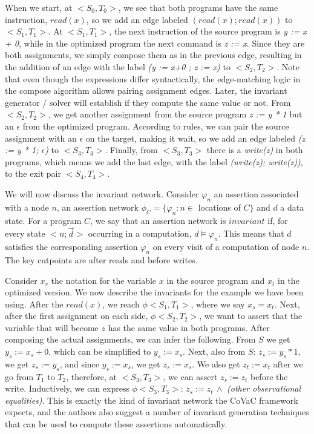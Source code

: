 When we start, at $<S_0, T_0>$, we see that both programs have the same instruction, $read(x)$, so we add an edge labeled $(read(x); read(x))$ to $<S_1, T_1>$.
At $<S_1, T_1>$, the next instruction of the source program is \emph{y := x + 0}, while in the optimized program the next command is \emph{z := x}.
Since they are both assignments, we simply compose them as in the previous edge, resulting in the addition of an edge with the label \emph{(y := x+0 ; z := x)} to $<S_2, T_2>$.
Note that even though the expressions differ syntactically, the edge-matching logic in the compose algorithm allows pairing assignment edges.
Later, the invariant generator / solver will establish if they compute the same value or not.
From $<S_2, T_2>$, we get another assignment from the source program \emph{z := y * 1} but an $\epsilon$ from the optimized program.
According to rules, we can pair the source assignment with an $\epsilon$ on the target, making it wait, so we add an edge labeled \emph{(z := y * 1; $\epsilon$)} to $<S_3, T_3>$.
Finally, from $<S_3, T_3>$ there is a \emph{write(z)} in both programs, which means we add the last edge, with the label \emph{(write(z); write(z))}, to the exit pair $<S_4, T_4>$.

We will now discuss the invariant network.
Consider $\varphi_n$ an assertion associated with a node $n$, an assertion network $\phi_C = \{ \varphi_n : n \in$ locations of $C \}$ and $d$ a data state.
For a program $C$, we say that an assertion network is $invariant$ if, for every state $<n;\overrightarrow{d}>$ occurring in a computation, $d \vDash \varphi_n$.
This means that $d$ satisfies the corresponding assertion $\varphi_n$ on every visit of a computation of node $n$. 
The key cutpoints are after reads and before writes.

Consider $x_s$ the notation for the variable $x$ in the source program and $x_t$ in the optimized version.
We now describe the invariants for the example we have been using.
After the $read(x)$, we reach $\phi<S_1, T_1>$, where we say $x_s = x_t$.
Next, after the first assignment on each side, $\phi<S_2, T_2>$, we want to assert that the variable that will become $z$ has the same value in both programs.
After composing the actual assignments, we can infer the following.
From $S$ we get $y_s := x_s + 0$, which can be simplified to $y_s := x_s$.
Next, also from $S$: $z_s := y_s * 1$, we get $z_s := y_s$, and since $y_s := x_s$, we get $z_s := x_s$.
We also get $z_t := x_t$ after we go from $T_1$ to $T_2$, therefore, at $<S_3, T_3>$, we can assert $z_s := z_t$ before the write.
Inductively, we can express $\phi<S_3, T_3> : \, z_s := z_t \, \land$ \emph{(other observational equalities)}.
This is exactly the kind of invariant network the CoVaC framework expects, and the authors also suggest a number of invariant generation techniques that can be used to compute these assertions automatically.

